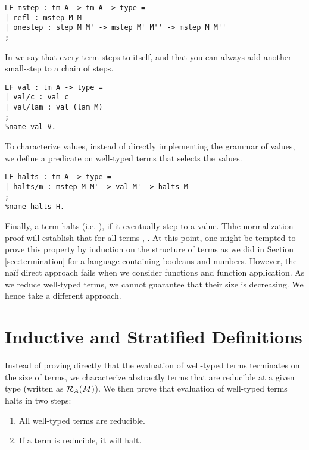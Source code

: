 \begin{lstlisting}
LF mstep : tm A -> tm A -> type =
| refl : mstep M M
| onestep : step M M' -> mstep M' M'' -> mstep M M''
;
\end{lstlisting}

In  we say that every term steps to itself, and that you can
always add another small-step to a chain of steps.

\begin{lstlisting}
LF val : tm A -> type =
| val/c : val c
| val/lam : val (lam M)
;
%name val V.
\end{lstlisting}

To characterize values, instead of directly implementing the grammar
of values, we define a predicate on well-typed terms that selects the
values.

\begin{lstlisting}
LF halts : tm A -> type =
| halts/m : mstep M M' -> val M' -> halts M
;
%name halts H.
\end{lstlisting}

Finally, a term  halts (i.e. ), if it eventually
step to a value. 
Thhe normalization proof will establish that for all terms , 
. At
this point, one might be tempted to prove this property by induction on the
structure of terms as we did in Section \ref{sec:termination} for a
language containing booleans and numbers. However, the na\"if direct approach
fails when we consider functions and function application. As we
reduce well-typed terms, we cannot guarantee that their size is
decreasing. We hence take a different approach.

\section{Inductive and Stratified Definitions}
Instead of proving directly that the evaluation of well-typed terms
terminates on the size of terms, we characterize abstractly terms that
are reducible at a given type (written as $\mathcal{R}_{A}(M)$). We then prove
that evaluation of well-typed terms halts in two steps:

\begin{enumerate}
\item All well-typed terms are reducible. 
\item If a term is reducible, it will halt.
\end{enumerate}

